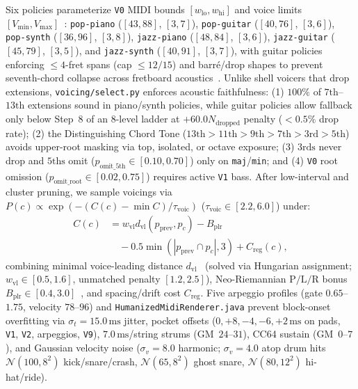 \documentclass{article}
\begin{document}
Six policies parameterize {\small\texttt{V0}} MIDI bounds $[w_{\text{lo}}, w_{\text{hi}}]$ and voice limits $[V_{\text{min}}, V_{\text{max}}]$~\cite{tymoczko2011geometry}: {\small\texttt{pop-piano}} ($[43, 88]$, $[3, 7]$), {\small\texttt{pop-guitar}} ($[40, 76]$, $[3, 6]$), {\small\texttt{pop-synth}} ($[36, 96]$, $[3, 8]$), {\small\texttt{jazz-piano}} ($[48, 84]$, $[3, 6]$), {\small\texttt{jazz-guitar}} ($[45, 79]$, $[3, 5]$), and {\small\texttt{jazz-synth}} ($[40, 91]$, $[3, 7]$), with guitar policies enforcing $\le 4$-fret spans (cap $\le 12/15$) and barr\'e/drop shapes to prevent seventh-chord collapse across fretboard acoustics~\cite{nadar2019towards}. Unlike shell voicers that drop extensions, {\small\texttt{voicing/select.py}} enforces acoustic faithfulness: (1) $100\%$ of $7\text{th}$--$13\text{th}$ extensions sound in piano/synth policies, while guitar policies allow fallback only below Step~8 of an 8-level ladder at $+60.0 N_{\text{dropped}}$ penalty ($< 0.5\%$ drop rate); (2) the Distinguishing Chord Tone ($13\text{th} > 11\text{th} > 9\text{th} > 7\text{th} > 3\text{rd} > 5\text{th}$) avoids upper-root masking via top, isolated, or octave exposure; (3) $3\text{rds}$ never drop and $5\text{ths}$ omit ($p_{\text{omit\_5th}} \in [0.10, 0.70]$) only on {\small\texttt{maj}}/{\small\texttt{min}}; and (4) {\small\texttt{V0}} root omission ($p_{\text{omit\_root}} \in [0.02, 0.75]$) requires active {\small\texttt{V1}} bass. After low-interval and cluster pruning, we sample voicings via $P(c) \propto \exp(-(C(c) - \min C)/\tau_{\text{voic}})$ ($\tau_{\text{voic}} \in [2.2, 6.0]$) under:
\begin{equation}\label{eq:voicing_cost}
  \begin{split}
    C(c) &= w_{\text{vl}} d_{\text{vl}}(p_{\text{prev}}, p_c) - B_{\text{plr}} \\
    &\quad - 0.5 \min(|p_{\text{prev}} \cap p_c|, 3) + C_{\text{reg}}(c),
  \end{split}
\end{equation}
combining minimal voice-leading distance $d_{\text{vl}}$~\cite{tymoczko2006geometry,eitel2024perception} (solved via Hungarian assignment; $w_{\text{vl}} \in [0.5, 1.6]$, unmatched penalty $[1.2, 2.5]$), Neo-Riemannian $\text{P}/\text{L}/\text{R}$ bonus $B_{\text{plr}} \in [0.4, 3.0]$~\cite{cohn1998introduction,douthett1998parsimonious}, and spacing/drift cost $C_{\text{reg}}$. Five arpeggio profiles (gate $0.65$--$1.75$, velocity $78$--$96$) and {\small\texttt{HumanizedMidiRenderer.java}} prevent block-onset overfitting via $\sigma_t = 15.0\,\text{ms}$ jitter, pocket offsets ($0, +8, -4, -6, +2\,\text{ms}$ on pads, {\small\texttt{V1}}, {\small\texttt{V2}}, arpeggios, {\small\texttt{V9}}), $7.0\,\text{ms}$/string strums (GM~$24$--$31$), CC64 sustain (GM~$0$--$7$), and Gaussian velocity noise ($\sigma_v = 8.0$ harmonic; $\sigma_v = 4.0$ atop drum hits $\mathcal{N}(100, 8^2)$ kick/snare/crash, $\mathcal{N}(65, 8^2)$ ghost snare, $\mathcal{N}(80, 12^2)$ hi-hat/ride).
\end{document}
